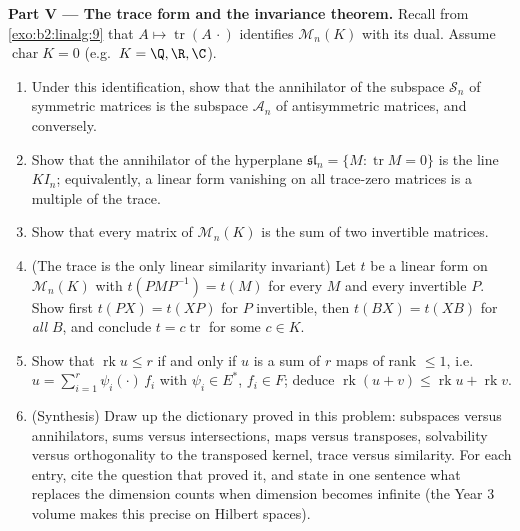 \begin{problem}
\medskip
\noindent\textbf{Part V --- The trace form and the invariance
theorem.} Recall from \cref{exo:b2:linalg:9} that $A \mapsto
\operatorname{tr}(A\,\cdot)$ identifies $\mathcal{M}_n(K)$ with
its dual. Assume $\operatorname{char} K = 0$ (e.g.\ $K = \Q, \R,
\C$).
\begin{enumerate}[resume]
  \item Under this identification, show that the annihilator of
        the subspace $\mathcal{S}_n$ of symmetric matrices is the
        subspace $\mathcal{A}_n$ of antisymmetric matrices, and
        conversely.
  \item Show that the annihilator of the hyperplane
        $\mathfrak{sl}_n = \{M : \operatorname{tr} M = 0\}$ is
        the line $K I_n$; equivalently, a linear form vanishing
        on all trace-zero matrices is a multiple of the trace.
  \item Show that every matrix of $\mathcal{M}_n(K)$ is the sum
        of two invertible matrices.
  \item (The trace is the only linear similarity invariant) Let
        $t$ be a linear form on $\mathcal{M}_n(K)$ with
        $t(PMP^{-1}) = t(M)$ for every $M$ and every invertible
        $P$. Show first $t(PX) = t(XP)$ for $P$ invertible, then
        $t(BX) = t(XB)$ for \emph{all} $B$, and conclude $t = c
        \operatorname{tr}$ for some $c \in K$.
  \item Show that $\operatorname{rk} u \leq r$ if and only if $u$
        is a sum of $r$ maps of rank $\leq 1$, i.e.\ $u =
        \sum_{i=1}^{r} \psi_i(\cdot)\,f_i$ with $\psi_i \in E^*$,
        $f_i \in F$; deduce $\operatorname{rk}(u + v) \leq
        \operatorname{rk} u + \operatorname{rk} v$.
  \item (Synthesis) Draw up the dictionary proved in this
        problem: subspaces versus annihilators, sums versus
        intersections, maps versus transposes, solvability versus
        orthogonality to the transposed kernel, trace versus
        similarity. For each entry, cite the question that proved
        it, and state in one sentence what replaces the dimension
        counts when dimension becomes infinite (the Year 3 volume
        makes this precise on Hilbert spaces).
\end{enumerate}
\end{problem}
